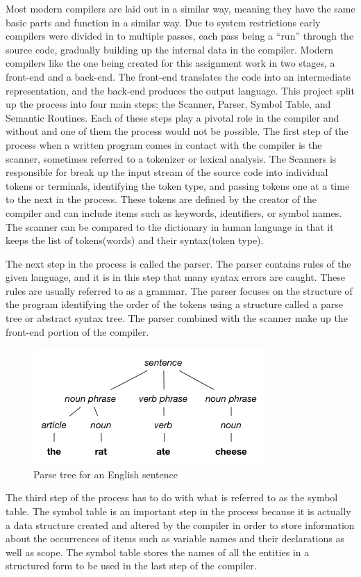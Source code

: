 \documentclass[12pt, oneside]{article}   	%
\begin{document}
Most modern compilers are laid out in a similar way, meaning they have
the same basic parts and function in a similar way. Due to system restrictions
early compilers were divided in to multiple passes, each pass being a “run”
through the source code, gradually building up the internal data in the compiler.
Modern compilers like the one being created for this assignment work in two
stages, a front-end and a back-end. The front-end translates the code into an
intermediate representation, and the back-end produces the output language.
This project split up the process into four main steps: the Scanner, Parser,
Symbol Table, and Semantic Routines. Each of these steps play a pivotal role in
the compiler and without and one of them the process would not be possible. The
first step of the process when a written program comes in contact with the
compiler is the scanner, sometimes referred to a tokenizer or lexical analysis.
The Scanners is responsible for break up the input stream of the source code
into individual tokens or terminals, identifying the token type, and passing tokens
one at a time to the next in the process. These tokens are defined by the creator
of the compiler and can include items such as keywords, identifiers, or symbol
names. The scanner can be compared to the dictionary in human language in that it keeps the list of tokens(words) and their syntax(token type).

The next step in the process is called the parser. The parser contains
rules of the given language, and it is in this step that many syntax
errors are caught. These rules are usually referred to as a grammar. The parser focuses on the structure of the program identifying
the order of the tokens using a structure called a parse tree or abstract syntax
tree. The parser combined with the scanner make up the front-end portion of the
compiler.\cite{history}

\begin{figure}[h!]
	\centerline{\includegraphics[width=.4\linewidth]{pics/p_tree}}
	\caption{Parse tree for an English sentence\cite{pic}}
\end{figure}

 The third step of the process has to do with what is referred to as the
symbol table. The symbol table is an important step in the process because it is
actually a data structure created and altered by the compiler in order to store
information about the occurrences of items such as variable names and their
declarations as well as scope. The symbol table stores the names of all the
entities in a structured form to be used in the last step of the compiler.
\end{document}

